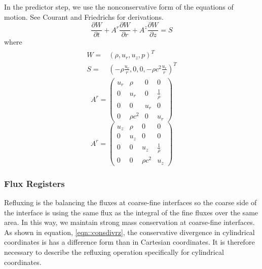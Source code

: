 In the predictor step, we use the  nonconservative form of the
equations of motion.  See Courant and Friedrichs
\cite{COURANTANDFRIED} for derivations.
\begin{equation}
    \frac{\partial W  }{\partial t} + 
A^r \frac{\partial  W }{\partial r} +
A^z \frac{\partial  W }{\partial z} = S
\end{equation}
where
\begin{align*}
\begin{split}
W   =& \left(\rho     ,  u_r    ,   u_z    , p                    \right)^T \\
S   =& \left(-\rho \frac{u_r}{r} , 0  ,  0, -\rho c^2 \frac{u_r}{r} \right)^T  
\end{split}
\end{align*}
\begin{equation*}
  A^r = \left( \begin{array}{cccc} 
 u_r       & \rho      & 0           & 0                \\
 0         & u_r       & 0           & \frac{1}{\rho}   \\
 0         & 0         & u_r         & 0                \\
 0         & \rho c^2  & 0           &  u_r
\end{array}        \right)
\end{equation*}
\begin{equation*}
A^r = \left( \begin{array}{cccc} 
 u_z       & \rho      & 0           & 0                \\
 0         & u_z       & 0           & 0                \\
 0         & 0         & u_z         & \frac{1}{\rho}   \\
 0         & 0         & \rho c^2   &  u_z
\end{array}        \right)
\end{equation*}

\subsubsection{Flux Registers}

Refluxing is the balancing the fluxes at coarse-fine interfaces
so the coarse side of the interface is using the same flux as the
integral of the fine fluxes over the same area.    In this way,
we maintain strong mass conservation at coarse-fine interfaces.
As shown in equation, \ref{eqn::consdivrz}, the conservative
divergence in cylindrical coordinates is has a difference form than
in Cartesian coordinates.   It is therefore necessary to describe the
refluxing operation specifically for cylindrical coordinates.

